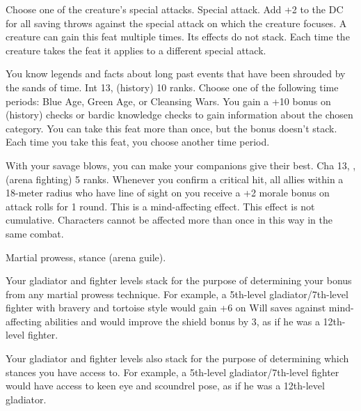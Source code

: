 
{Choose one of the creature's special attacks.}
{Special attack.}
{Add +2 to the DC for all saving throws against the special attack on which the creature focuses.}
{}
{A creature can gain this feat multiple times. Its effects do not stack. Each time the creature takes the feat it applies to a different special attack.}

{You know legends and facts about long past events that have been shrouded by the sands of time.}
{Int 13,  (history) 10 ranks.}
{Choose one of the following time periods: Blue Age, Green Age, or Cleansing Wars. You gain a +10 bonus on  (history) checks or bardic knowledge checks to gain information about the chosen category.}{}
{You can take this feat more than once, but the bonus doesn't stack. Each time you take this feat, you choose another time period.}





{With your savage blows, you can make your companions give their best.}
{Cha 13, ,  (arena fighting) 5 ranks.}
{Whenever you confirm a critical hit, all allies within a 18-meter radius who have line of sight on you receive a +2 morale bonus on attack rolls for 1 round. This is a mind-affecting effect. This effect is not cumulative. Characters cannot be affected more than once in this way in the same combat.}{}{}

{Martial prowess, stance (arena guile).}
{
Your gladiator and fighter levels stack for the purpose of determining your bonus from any martial prowess technique. For example, a 5th-level gladiator/7th-level fighter with bravery and tortoise style would gain +6 on Will saves against mind-affecting abilities and would improve the shield bonus by 3, as if he was a 12th-level fighter.

Your gladiator and fighter levels also stack for the purpose of determining which stances you have access to. For example, a 5th-level gladiator/7th-level fighter would have access to keen eye and scoundrel pose, as if he was a 12th-level gladiator.
}

